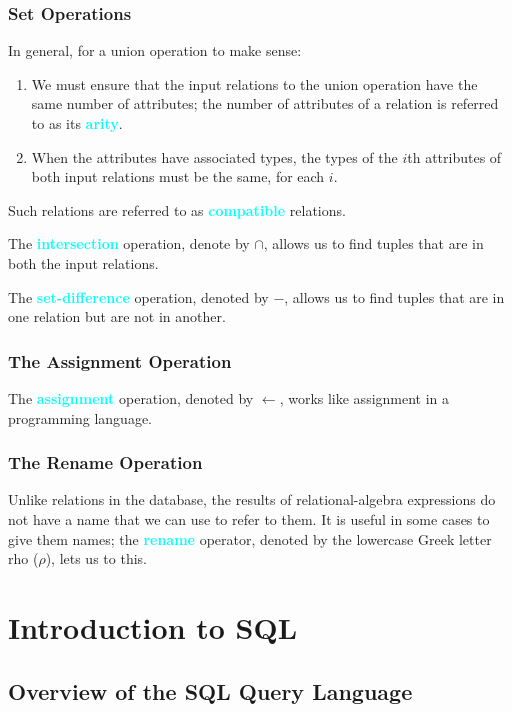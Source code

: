 \documentclass{Beautybook-EN}
\newcommand{\textcy}[1]{\textbf{\textcolor{cyan}{#1}}}
\begin{document}
\subsection{Set Operations}

In general, for a union operation to make sense:
\begin{enumerate}
    \item We must ensure that the input relations to the union operation have the same number of attributes; the number of attributes of a relation is referred to as its \textcy{arity}.
    \item When the attributes have associated types, the types of the $i$th attributes of both input relations must be the same, for each $i$.
\end{enumerate}
Such relations are referred to as \textcy{compatible} relations.

The \textcy{intersection} operation, denote by $\cap$, allows us to find tuples that are in both the input relations.

The \textcy{set-difference} operation, denoted by $-$, allows us to find tuples that are in one relation but are not in another.

\subsection{The Assignment Operation}

The \textcy{assignment} operation, denoted by $\leftarrow$, works like assignment in a programming language.

\subsection{The Rename Operation}

Unlike relations in the database, the results of relational-algebra expressions do not have a name that we can use to refer to them. It is useful in some cases to give them names; the \textcy{rename} operator, denoted by the lowercase Greek letter rho ($\rho$), lets us to this.

\chapter{Introduction to SQL}
\section{Overview of the SQL Query Language}
\end{document}
